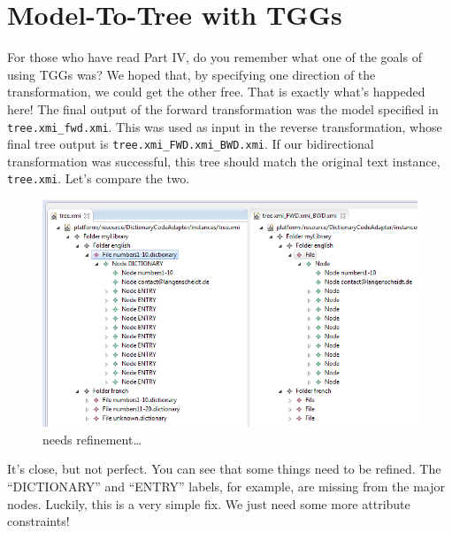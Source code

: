 \newpage
\section{Model-To-Tree with TGGs}
\genHeader

For those who have read Part IV, do you remember what one of the goals of using TGGs was? We hoped that, by specifying one direction of the transformation, we
could get the other free. That is exactly what's happeded here! The final output of the forward transformation was the model specified in
\texttt{tree.xmi\_fwd.xmi}. This was used as input in the reverse transformation, whose final tree output is \texttt{tree.xmi\_FWD.xmi\_BWD.xmi}. If our
bidirectional transformation was successful, this tree should match the original text instance, \texttt{tree.xmi}. Let's compare the two.

\vspace{0.5cm}

\begin{figure}[htpb]
\begin{center}
  \includegraphics[width=\textwidth]{eclipse_generatedBackwardsModel}
  \caption{needs refinement\ldots}
  \label{eclipse:generatedBkwrdMdl}
\end{center}
\end{figure}

\vspace{0.5cm}

It's close, but not perfect. You can see that some things need to be refined. The ``DICTIONARY'' and ``ENTRY'' labels, for example, are missing from the
major nodes. Luckily, this is a very simple fix. We just need some more attribute constraints!





